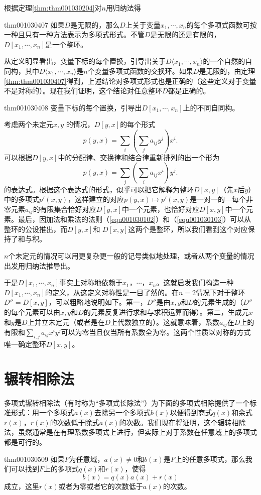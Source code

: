 根据定理\ref{thm:thm001030204}对$n$用归纳法得
\begin{theorem}{}{thm001030407}
如果$D$是无限的，那么$D$上关于变量$x_1,\cdots, x_n$的每个多项式函数可按一种且只有一种方法表示为多项式形式。不管$D$是无限的还是有限的，$D[x_1,\cdots,x_n]$是一个整环。
\end{theorem}

从定义明显看出，变量下标的每个置换，引导出关于$D\langle{x_1,\cdots,x_n}\rangle$的一个自然的自同构，其中$D\langle{x_1,\cdots, x_n}\rangle$是$n$个变量多项式函数的交换环。如果$D$是无限的，由定理\ref{thm:thm001030407}得到，上述结论对多项式形式也是正确的（这些定义对于变量不是对称的）。现在我们证明，这个结论对任意整环$D$都是正确的。
\begin{theorem}{}{thm001030408}
变量下标的每个置换，引导出$D[x_1,\cdots,x_n]$上的不同自同构。
\end{theorem}

考虑两个未定元$x, y$
的情况，$D[y, x]$的每个形式
\[
p(y, x) = \sum_{i}{(\sum_{j}{a_{ij}y^j})x^i}.
\]
可以根据$D[y,x]$中的分配律、交换律和结合律重新排列的出一个形为
\[
p(y, x) = \sum_{j}{(\sum_{i}{a_{ij}x^i})y^j}.
\]
的表达式。根据这个表达式的形式，似乎可以把它解释为整环$D[x, y]$（先$x$后$y$）中的多项式$p'(x, y)$，这样建立的对应$p(y, x) \mapsto p'(x, y)$是一对一的---每个非零元素$a_{ij}$的有限集合恰好对应$D[y, x]$中一个元素，也恰好对应$D[x, y]$中一个元素。最后，因加法和乘法的法则（\ref{equ001030102}）和（\ref{equ001030103}）可以从整环的公设推出，而$D[y, x]$和 $D[x, y]$这两个是整环，所以我们看到这个对应保持了和与积。

$n$个未定元的情况可以用更复杂更一般的记号类似地处理，或者从两个变量的情况出发用归纳法推导出。

于是$D[x_1, \cdots, x_n]$事实上对称地依赖于$x_1$，$\cdots$，$x_n$。这就启发我们构造一种$D[x_1, \cdots, x_n]$的定义，从这定义对称性是一目了然的。在$n=2$情况下对于整环$D''=D[x,y]$，可以粗略地说明如下。第一，$D''$是由$x, y$和$D$的元素生成的（$D''$的每个元素可以由$x, y$和$D$的元素反复进行求和与求积运算而得）。第二，生成元$x$和$y$是$D$上并立未定元（或者是在$D$上代数独立的）。这就意味着，系数$a_{ij}$在$D$上的有限和$\sum_{i,j}{a_{ij}x^iy^j}$可以为零当且仅当所有系数全为零。这两个性质以对称的方式唯一确定整环$D[x, y]$。


\section{辗转相除法}\label{subsection0010305}
多项式辗转相除法（有时称为“多项式长除法”）为下面的多项式相除提供了一个标准形式：用一个多项式$a(x)$去除另一个多项式$b(x)$以便得到商式$q(x)$和余式$r(x)$，$r(x)$的次数低于除式$a(x)$的次数。我们现在将证明，这个辗转相除法，虽然通常是在有理系数多项式上进行，但实际上对于系数在任意域上的多项式都是可行的。
\begin{theorem}{}{thm001030509}
如果$F$为任意域，$a(x) \neq 0$和$b(x)$是$F$上的任意多项式，那么我们可以找到$F$上的多项式$q(x)$和$r(x)$，使得
\begin{equation}\label{equ001030508}
b(x)=q(x)a(x)+r(x)
\end{equation}
成立，这里$r(x)$或者为零或者它的次数低于$a(x)$的次数。
\end{theorem}

